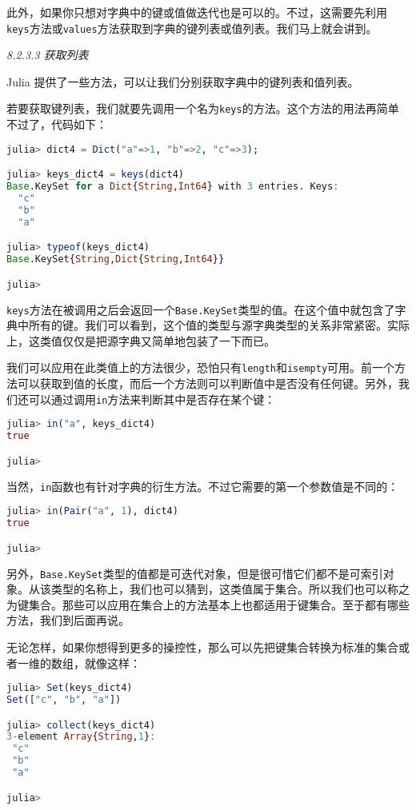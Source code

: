 此外，如果你只想对字典中的键或值做迭代也是可以的。不过，这需要先利用\verb`keys`方法或\verb`values`方法获取到字典的键列表或值列表。我们马上就会讲到。

\textsl{8.2.3.3 获取列表}

Julia 提供了一些方法，可以让我们分别获取字典中的键列表和值列表。

若要获取键列表，我们就要先调用一个名为\verb`keys`的方法。这个方法的用法再简单不过了，代码如下：
\begin{lstlisting}[language=julia]
julia> dict4 = Dict("a"=>1, "b"=>2, "c"=>3);

julia> keys_dict4 = keys(dict4)
Base.KeySet for a Dict{String,Int64} with 3 entries. Keys:
  "c"
  "b"
  "a"

julia> typeof(keys_dict4)
Base.KeySet{String,Dict{String,Int64}}

julia> 
\end{lstlisting}

\verb`keys`方法在被调用之后会返回一个\verb`Base.KeySet`类型的值。在这个值中就包含了字典中所有的键。我们可以看到，这个值的类型与源字典类型的关系非常紧密。实际上，这类值仅仅是把源字典又简单地包装了一下而已。

我们可以应用在此类值上的方法很少，恐怕只有\verb`length`和\verb`isempty`可用。前一个方法可以获取到值的长度，而后一个方法则可以判断值中是否没有任何键。另外，我们还可以通过调用\verb`in`方法来判断其中是否存在某个键：
\begin{lstlisting}[language=julia]
julia> in("a", keys_dict4)
true

julia> 
\end{lstlisting}

当然，\verb`in`函数也有针对字典的衍生方法。不过它需要的第一个参数值是不同的：
\begin{lstlisting}[language=julia]
julia> in(Pair("a", 1), dict4)
true

julia> 
\end{lstlisting}

另外，\verb`Base.KeySet`类型的值都是可迭代对象，但是很可惜它们都不是可索引对象。从该类型的名称上，我们也可以猜到，这类值属于集合。所以我们也可以称之为键集合。那些可以应用在集合上的方法基本上也都适用于键集合。至于都有哪些方法，我们到后面再说。

无论怎样，如果你想得到更多的操控性，那么可以先把键集合转换为标准的集合或者一维的数组，就像这样：
\begin{lstlisting}[language=julia]
julia> Set(keys_dict4)
Set(["c", "b", "a"])

julia> collect(keys_dict4)
3-element Array{String,1}:
 "c"
 "b"
 "a"

julia> 
\end{lstlisting}

